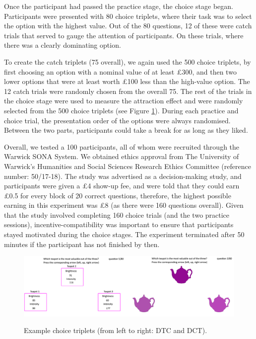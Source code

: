 \documentclass[11pt,a4paper]{article}
\begin{document}
Once the participant had passed the practice stage, the choice stage began. Participants were presented with 80 choice triplets, where their task was to select the option with the highest value. Out of the 80 questions, 12 of these were catch trials that served to gauge the attention of participants. On these trials, where there was a clearly dominating option. 

To create the catch triplets (75 overall), we again used the 500 choice triplets, by first choosing an option with a nominal value of at least £300, and then two lower options that were at least worth £100 less than the high-value option. The 12 catch trials were randomly chosen from the overall 75. The rest of the trials in the choice stage were used to measure the attraction effect and were randomly selected from the 500 choice triplets (see Figure \ref{fig:choicetriplets}). During each practice and choice trial, the presentation order of the options were always randomised. Between the two parts, participants could take a break for as long as they liked.


Overall, we tested a 100 participants, all of whom were recruited through the Warwick SONA System.  We obtained ethics approval from The University of Warwick’s Humanities and Social Sciences Research Ethics Committee (reference number: 50/17-18). The study was advertised as a decision-making study, and participants were given a £4 show-up fee, and were told that they could earn £0.5 for every block of 20 correct questions, therefore, the highest possible earning in this experiment was £8 (as there were 160 questions overall). Given that the study involved completing 160 choice trials (and the two practice sessions), incentive-compatibility was important to ensure that participants stayed motivated during the choice stages. The experiment terminated after 50 minutes if the participant has not finished by then. 


\begin{figure}
\centering
\caption{Example choice triplets (from left to right: DTC and DCT).}
\includegraphics[width=1\textwidth]{choice_triplets.png}
\label{fig:choicetriplets}
\end{figure}
\end{document}
